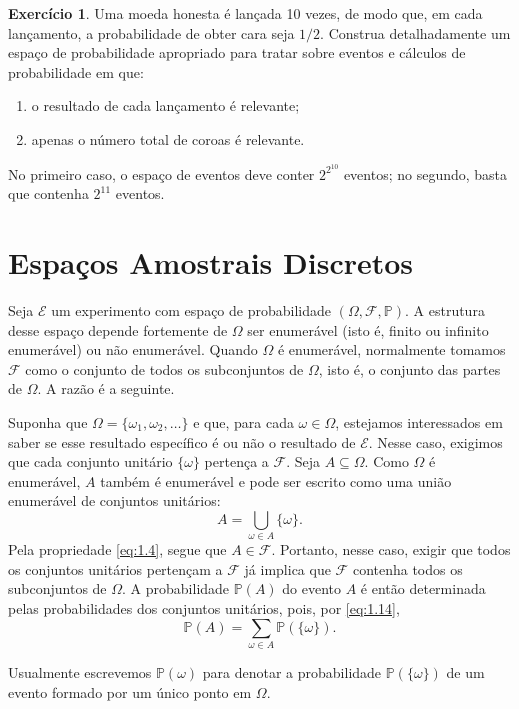 \documentclass[12pt,portuguese]{article}
\theoremstyle{definition}
\newtheorem{exercise}{Exercício}
\begin{document}
\begin{exercise}\label{exercise:1.22}
Uma moeda honesta é lançada 10 vezes, de modo que, em cada lançamento, a
probabilidade de obter cara seja $1/2$. Construa detalhadamente
um espaço de probabilidade apropriado para tratar sobre eventos e cálculos de probabilidade
em que:
\begin{enumerate}[label=(\alph*), ref=\alph*]
\item o resultado de cada lançamento é relevante;
\item apenas o número total de coroas é relevante.
\end{enumerate}
No primeiro caso, o espaço de eventos deve conter \(2^{2^{10}}\) eventos;
no segundo, basta que contenha \(2^{11}\) eventos.
\end{exercise}

\section{Espaços Amostrais Discretos}

Seja \(\mathcal{E}\) um experimento com espaço de probabilidade
\((\Omega, \mathcal{F}, \mathbb{P})\). A estrutura desse espaço depende
fortemente de \(\Omega\) ser enumerável (isto é, finito ou infinito enumerável)
ou não enumerável. Quando \(\Omega\) é enumerável, normalmente tomamos
\(\mathcal{F}\) como o conjunto de todos os subconjuntos de \(\Omega\),
isto é, o conjunto das partes de \(\Omega\). A razão é a seguinte.

Suponha que \(\Omega = \{\omega_1, \omega_2, \ldots\}\) e que, para cada
\(\omega \in \Omega\), estejamos interessados em saber se esse resultado
específico é ou não o resultado de \(\mathcal{E}\). Nesse caso, exigimos que
cada conjunto unitário \(\{\omega\}\) pertença a \(\mathcal{F}\). Seja
\(A \subseteq \Omega\). Como \(\Omega\) é enumerável, \(A\) também é
enumerável e pode ser escrito como uma união enumerável de conjuntos unitários:
\[
A = \bigcup_{\omega \in A} \{\omega\}.
\]
Pela propriedade \eqref{eq:1.4}, segue que \(A \in \mathcal{F}\). Portanto,
nesse caso, exigir que todos os conjuntos unitários pertençam a
\(\mathcal{F}\) já implica que \(\mathcal{F}\) contenha todos os subconjuntos
de \(\Omega\). A probabilidade \(\mathbb{P}(A)\) do evento \(A\) é então
determinada pelas probabilidades dos conjuntos unitários, pois, por
\eqref{eq:1.14},
\[
\mathbb{P}(A) = \sum_{\omega \in A} \mathbb{P}(\{\omega\}).
\]

Usualmente escrevemos \(\mathbb{P}(\omega)\) para denotar a probabilidade
\(\mathbb{P}(\{\omega\})\) de um evento formado por um único ponto em
\(\Omega\).
\end{document}
